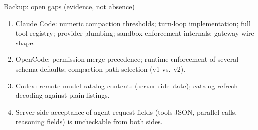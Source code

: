 \documentclass[aspectratio=169,11pt]{beamer}
\newcommand{\codex}[0]{Codex}
\newcommand{\occ}[0]{OpenCode}
\newcommand{\ccc}[0]{Claude Code}
\begin{document}
\begin{frame}{Backup: open gaps (evidence, not absence)}
  \begin{enumerate}
    \item \ccc{}: numeric compaction thresholds; turn-loop
      implementation; full tool registry; provider plumbing; sandbox
      enforcement internals; gateway wire shape.
    \item \occ{}: permission merge precedence; runtime enforcement of
      several schema defaults; compaction path selection (v1 vs.\ v2).
    \item \codex{}: remote model-catalog contents (server-side state);
      catalog-refresh decoding against plain  listings.
    \item Server-side acceptance of agent request fields (tools JSON,
      parallel calls, reasoning fields) is uncheckable from both sides.
  \end{enumerate}
\end{frame}
\end{document}
